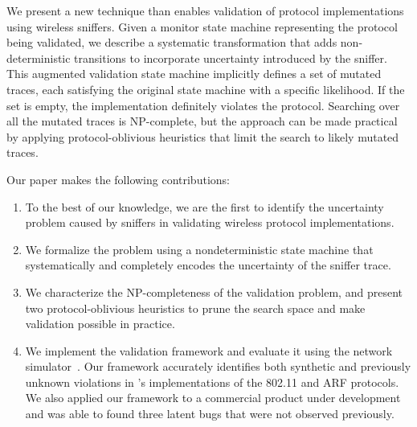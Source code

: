 We present a new technique than enables validation of protocol implementations using
wireless sniffers. Given a monitor state machine representing the protocol being
validated, we describe a systematic transformation that adds non-deterministic
transitions to incorporate uncertainty introduced by the sniffer. This
augmented validation state machine implicitly defines a set of
mutated traces, each satisfying the original state machine with a specific
likelihood. If the set is empty, the implementation definitely violates the
protocol. Searching over all the mutated traces is NP-complete, but the approach
can be made practical by applying protocol-oblivious heuristics that limit the
search to likely mutated traces.

Our paper makes the following contributions:
\begin{enumerate}
  \item To the best of our knowledge, we are the first to identify the
    uncertainty problem caused by sniffers in validating wireless protocol
    implementations.
  \item We formalize the problem using a nondeterministic state machine that
    systematically and completely encodes the uncertainty of the
    sniffer trace.
  \item We characterize the NP-completeness of the validation problem, and
    present two protocol-oblivious heuristics to prune the search space and make
    validation possible in practice.
  \item We implement the validation framework and evaluate it using the \ns{}
    network simulator~\cite{riley2010ns}. Our framework accurately identifies
    both synthetic and previously unknown violations in \ns{}'s implementations
    of the 802.11 and ARF protocols.  We also applied our framework to a
    commercial product under development and was able to found three latent bugs
    that were not observed previously.
\end{enumerate}

